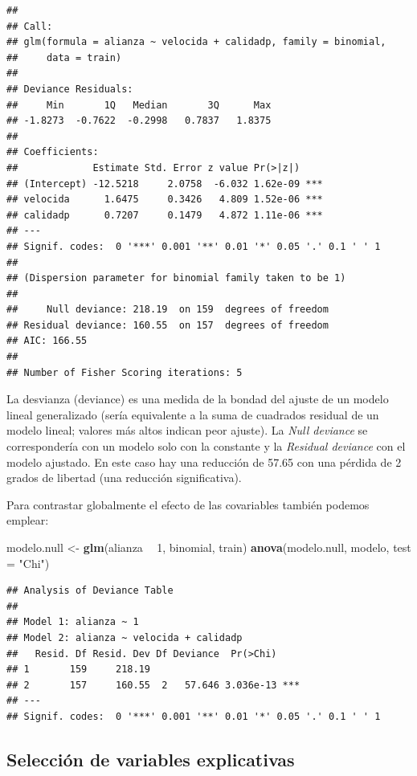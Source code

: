 \documentclass[
  spanish,
]{book}
\newenvironment{Shaded}{\begin{snugshade}}{\end{snugshade}}
\newcommand{\DataTypeTok}[1]{\textcolor[rgb]{0.13,0.29,0.53}{#1}}
\newcommand{\DecValTok}[1]{\textcolor[rgb]{0.00,0.00,0.81}{#1}}
\newcommand{\KeywordTok}[1]{\textcolor[rgb]{0.13,0.29,0.53}{\textbf{#1}}}
\newcommand{\NormalTok}[1]{#1}
\newcommand{\OperatorTok}[1]{\textcolor[rgb]{0.81,0.36,0.00}{\textbf{#1}}}
\newcommand{\StringTok}[1]{\textcolor[rgb]{0.31,0.60,0.02}{#1}}
\theoremstyle{break}
\theoremstyle{definition}
\theoremstyle{definition}
\theoremstyle{definition}
\theoremstyle{remark}
\begin{document}
\begin{verbatim}
## 
## Call:
## glm(formula = alianza ~ velocida + calidadp, family = binomial, 
##     data = train)
## 
## Deviance Residuals: 
##     Min       1Q   Median       3Q      Max  
## -1.8273  -0.7622  -0.2998   0.7837   1.8375  
## 
## Coefficients:
##             Estimate Std. Error z value Pr(>|z|)    
## (Intercept) -12.5218     2.0758  -6.032 1.62e-09 ***
## velocida      1.6475     0.3426   4.809 1.52e-06 ***
## calidadp      0.7207     0.1479   4.872 1.11e-06 ***
## ---
## Signif. codes:  0 '***' 0.001 '**' 0.01 '*' 0.05 '.' 0.1 ' ' 1
## 
## (Dispersion parameter for binomial family taken to be 1)
## 
##     Null deviance: 218.19  on 159  degrees of freedom
## Residual deviance: 160.55  on 157  degrees of freedom
## AIC: 166.55
## 
## Number of Fisher Scoring iterations: 5
\end{verbatim}

La desvianza (deviance) es una medida de la bondad del ajuste de un modelo lineal generalizado (sería equivalente a la suma de cuadrados residual de un modelo lineal; valores más altos indican peor ajuste).
La \emph{Null deviance} se correspondería con un modelo solo con la constante y la \emph{Residual deviance} con el modelo ajustado.
En este caso hay una reducción de 57.65 con una pérdida de 2 grados de libertad (una reducción significativa).

Para contrastar globalmente el efecto de las covariables también podemos emplear:

\begin{Shaded}
\begin{Highlighting}[]
\NormalTok{modelo.null <-}\StringTok{ }\KeywordTok{glm}\NormalTok{(alianza }\OperatorTok{~}\StringTok{ }\DecValTok{1}\NormalTok{, binomial, train)}
\KeywordTok{anova}\NormalTok{(modelo.null, modelo, }\DataTypeTok{test =} \StringTok{"Chi"}\NormalTok{)}
\end{Highlighting}
\end{Shaded}

\begin{verbatim}
## Analysis of Deviance Table
## 
## Model 1: alianza ~ 1
## Model 2: alianza ~ velocida + calidadp
##   Resid. Df Resid. Dev Df Deviance  Pr(>Chi)    
## 1       159     218.19                          
## 2       157     160.55  2   57.646 3.036e-13 ***
## ---
## Signif. codes:  0 '***' 0.001 '**' 0.01 '*' 0.05 '.' 0.1 ' ' 1
\end{verbatim}

\hypertarget{selecciuxf3n-de-variables-explicativas}{%
\subsection{Selección de variables explicativas}\label{selecciuxf3n-de-variables-explicativas}}
\end{document}
